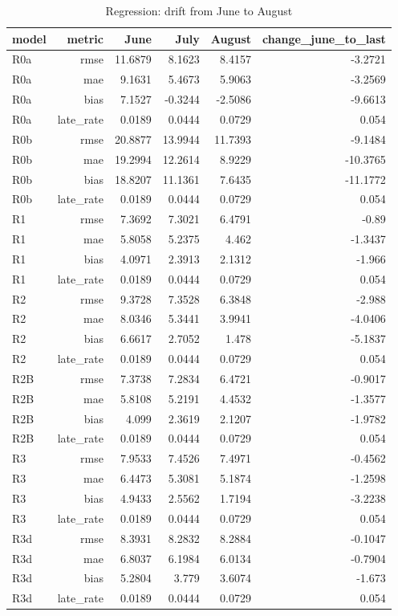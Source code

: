 \begin{table}[htbp]
\centering
\small
\caption{Regression: drift from June to August}
\begin{tabular}{lrrrrr}
\toprule
model & metric & June & July & August & change\_june\_to\_last \\
\midrule
R0a & rmse & 11.6879 & 8.1623 & 8.4157 & -3.2721 \\
R0a & mae & 9.1631 & 5.4673 & 5.9063 & -3.2569 \\
R0a & bias & 7.1527 & -0.3244 & -2.5086 & -9.6613 \\
R0a & late\_rate & 0.0189 & 0.0444 & 0.0729 & 0.054 \\
R0b & rmse & 20.8877 & 13.9944 & 11.7393 & -9.1484 \\
R0b & mae & 19.2994 & 12.2614 & 8.9229 & -10.3765 \\
R0b & bias & 18.8207 & 11.1361 & 7.6435 & -11.1772 \\
R0b & late\_rate & 0.0189 & 0.0444 & 0.0729 & 0.054 \\
R1 & rmse & 7.3692 & 7.3021 & 6.4791 & -0.89 \\
R1 & mae & 5.8058 & 5.2375 & 4.462 & -1.3437 \\
R1 & bias & 4.0971 & 2.3913 & 2.1312 & -1.966 \\
R1 & late\_rate & 0.0189 & 0.0444 & 0.0729 & 0.054 \\
R2 & rmse & 9.3728 & 7.3528 & 6.3848 & -2.988 \\
R2 & mae & 8.0346 & 5.3441 & 3.9941 & -4.0406 \\
R2 & bias & 6.6617 & 2.7052 & 1.478 & -5.1837 \\
R2 & late\_rate & 0.0189 & 0.0444 & 0.0729 & 0.054 \\
R2B & rmse & 7.3738 & 7.2834 & 6.4721 & -0.9017 \\
R2B & mae & 5.8108 & 5.2191 & 4.4532 & -1.3577 \\
R2B & bias & 4.099 & 2.3619 & 2.1207 & -1.9782 \\
R2B & late\_rate & 0.0189 & 0.0444 & 0.0729 & 0.054 \\
R3 & rmse & 7.9533 & 7.4526 & 7.4971 & -0.4562 \\
R3 & mae & 6.4473 & 5.3081 & 5.1874 & -1.2598 \\
R3 & bias & 4.9433 & 2.5562 & 1.7194 & -3.2238 \\
R3 & late\_rate & 0.0189 & 0.0444 & 0.0729 & 0.054 \\
R3d & rmse & 8.3931 & 8.2832 & 8.2884 & -0.1047 \\
R3d & mae & 6.8037 & 6.1984 & 6.0134 & -0.7904 \\
R3d & bias & 5.2804 & 3.779 & 3.6074 & -1.673 \\
R3d & late\_rate & 0.0189 & 0.0444 & 0.0729 & 0.054 \\
\bottomrule
\end{tabular}
\par\smallskip\begin{minipage}{\linewidth}\footnotesize \end{minipage}
\end{table}

